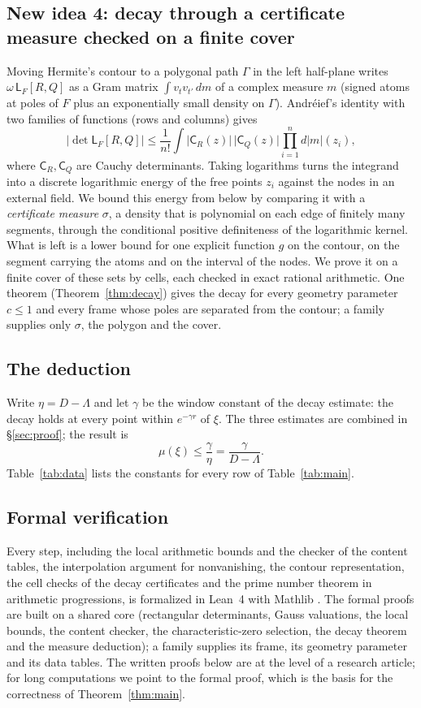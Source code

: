 \documentclass[11pt]{amsart}
\theoremstyle{definition}
\theoremstyle{remark}
\numberwithin{equation}{section}
\newcommand{\Lw}{\mathsf L}          %
\begin{document}
\subsection{New idea 4: decay through a certificate measure checked on a finite cover}
Moving Hermite's contour to a polygonal path $\Gamma$ in the left half-plane writes $\omega\,\Lw_F[R,Q]$ as a Gram matrix
$\int v_tv_{t'}\,dm$ of a complex measure $m$ (signed atoms at poles of $F$ plus an exponentially small density on
$\Gamma$). Andr\'eief's identity with two families of functions (rows and columns) gives
\[
 |\det\Lw_F[R,Q]|\le\frac1{n!}\int\bigl|\mathsf C_R(z)\bigr|\,\bigl|\mathsf C_Q(z)\bigr|\prod_{i=1}^nd|m|(z_i),
\]
where $\mathsf C_R,\mathsf C_Q$ are Cauchy determinants. Taking logarithms turns the integrand into a discrete
logarithmic energy of the free points $z_i$ against the nodes in an external field. We bound this energy from below by
comparing it with a \emph{certificate measure} $\sigma$, a density that is polynomial on each edge of finitely many
segments, through the conditional positive definiteness of the logarithmic kernel. What is left is a lower bound for
one explicit function $g$ on the contour, on the segment carrying the atoms and on the interval of the nodes. We prove
it on a finite cover of these sets by cells, each checked in exact rational arithmetic. One theorem
(Theorem~\ref{thm:decay}) gives the decay for every geometry parameter $c\le1$ and every frame whose poles are separated
from the contour; a family supplies only $\sigma$, the polygon and the cover.

\subsection{The deduction}
Write $\eta=D-\Lambda$ and let $\gamma$ be the window constant of the decay estimate: the decay holds at every point
within $e^{-\gamma r}$ of $\xi$. The three estimates are combined in \S\ref{sec:proof}; the result is
\[
 \mu(\xi)\le\frac\gamma\eta=\frac\gamma{D-\Lambda}.
\]
Table~\ref{tab:data} lists the constants for every row of Table~\ref{tab:main}.

\subsection{Formal verification}
Every step, including the local arithmetic bounds and the checker of the content tables, the interpolation argument
for nonvanishing, the contour representation, the cell checks of the decay certificates and the prime number theorem
in arithmetic progressions, is formalized in Lean~4 with Mathlib \cite{Lean4,Mathlib}. The formal proofs are built on
a shared core (rectangular determinants, Gauss valuations, the local bounds, the content checker, the
characteristic-zero selection, the decay theorem and the measure deduction); a family supplies its frame, its geometry
parameter and its data tables. The written proofs below are at the level of a research article; for long computations
we point to the formal proof, which is the basis for the correctness of Theorem~\ref{thm:main}.
\end{document}

